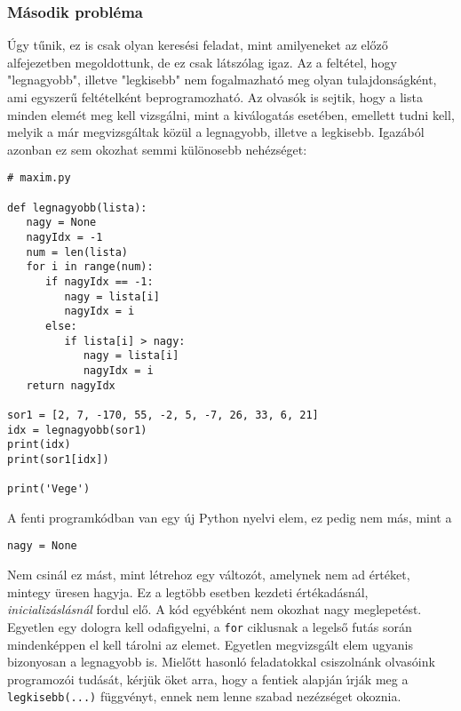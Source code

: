 \documentclass[12pt]{article}
\newcounter{feladat}
\newcounter{megold}
\begin{document}
\subsubsection{M\'asodik probl\'ema}



\'Ugy t\H{u}nik,  ez is csak olyan keres\'esi feladat, mint amilyeneket az el\H{o}z\H{o} alfejezetben megoldottunk, 
de ez csak l\'atsz\'olag igaz. Az a felt\'etel, hogy "legnagyobb", illetve "legkisebb" nem fogalmazhat\'o meg olyan 
tulajdons\'agk\'ent, ami egyszer\H{u} felt\'etelk\'ent beprogramozhat\'o. Az olvas\'ok is sejtik, hogy a lista minden 
elem\'et meg kell vizsg\'alni, mint a kiv\'alogat\'as eset\'eben, emellett tudni kell, melyik a m\'ar megvizsg\'altak 
k\"oz\"ul a legnagyobb, illetve a legkisebb. Igaz\'ab\'ol azonban ez sem okozhat semmi k\"ul\"onosebb neh\'ezs\'eget:

\begin{Verbatim}[fontsize=\small]
# maxim.py

def legnagyobb(lista):
   nagy = None
   nagyIdx = -1
   num = len(lista)
   for i in range(num):
      if nagyIdx == -1:
       	 nagy = lista[i]
         nagyIdx = i
      else:
         if lista[i] > nagy:
            nagy = lista[i]
            nagyIdx = i
   return nagyIdx

sor1 = [2, 7, -170, 55, -2, 5, -7, 26, 33, 6, 21]
idx = legnagyobb(sor1)
print(idx)
print(sor1[idx])

print('Vege')  
\end{Verbatim}

\noindent A fenti programk\'odban van egy \'uj Python nyelvi elem, ez pedig nem m\'as, mint a 

\begin{Verbatim}[fontsize=\small]
nagy = None
\end{Verbatim}

Nem csin\'al ez m\'ast, mint l\'etrehoz egy v\'altoz\'ot, amelynek nem ad \'ert\'eket, mintegy \"uresen hagyja. Ez a 
legt\"obb esetben kezdeti \'ert\'ekad\'asn\'al, {\sl inicializ\'asl\'asn\'al}  fordul el\H{o}. A 
k\'od egy\'ebk\'ent 
nem okozhat nagy meglepet\'est. Egyetlen egy dologra kell odafigyelni, a {\tt for} ciklusnak a legels\H{o} fut\'as 
sor\'an mindenk\'eppen el kell t\'arolni az elemet. Egyetlen megvizsg\'alt elem ugyanis bizonyosan a legnagyobb is. 
Miel\H{o}tt hasonl\'o feladatokkal csiszoln\'ank olvas\'oink programoz\'oi tud\'as\'at, k\'erj\"uk \"oket arra, hogy 
a fentiek alapj\'an \'{\i}rj\'ak meg a {\tt legkisebb(...)} f\"uggv\'enyt, ennek nem lenne szabad nez\'ezs\'eget okoznia.
\end{document}

